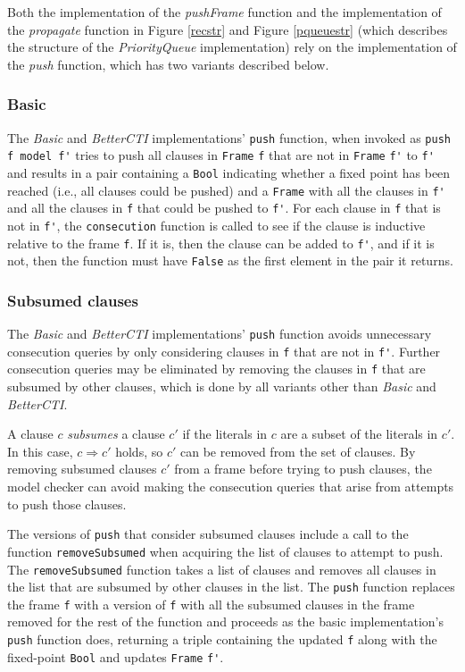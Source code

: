 \documentclass[12pt,a4paper,twoside,openright]{report}
\begin{document}
{Both the implementation of the {\it pushFrame} function and the implementation of the
{\it propagate} function in Figure \ref{recstr} and Figure \ref{pqueuestr} (which
describes the structure of the \emph{PriorityQueue} implementation)
rely on the implementation of the
{\it push} function, which has two variants described below.

\subsubsection{Basic}
The {\it Basic} and {\it BetterCTI} implementations' \verb,push, function,
when invoked as \verb,push f model f', tries to push all clauses in \verb,Frame, \verb,f,
that are not in \verb,Frame, \verb,f', to \verb,f', and
results in a pair containing a \verb,Bool, indicating whether a fixed point has been reached
(i.e., all clauses could be pushed) and a \verb,Frame, with all the clauses in \verb,f', and all
the clauses in \verb,f, that could be pushed to \verb,f',.
For each clause in \verb,f, that is not in \verb,f',, the \verb,consecution, function is called to
see if the clause is inductive relative to the frame \verb,f,. If it is, then
the clause can be added to \verb,f',, and if it is not, then the
function must have \verb,False, as the first element in the pair it returns.

\subsubsection{Subsumed clauses}
The \emph{Basic} and \emph{BetterCTI} implementations' \verb,push, function avoids unnecessary
consecution queries by only considering clauses in \verb,f, that are not in \verb,f',.
Further consecution queries may be eliminated by removing the clauses in \verb,f,
that are subsumed by other clauses, which is done by all variants other than {\it Basic}
and \emph{BetterCTI}.

A clause $c$ \emph{subsumes} a clause $c'$ if the literals in $c$ are a subset of the literals
in $c'$. In this case, $c \Rightarrow c'$ holds, so $c'$ can be removed from the set of clauses. By
removing subsumed clauses $c'$ from a frame before trying to push clauses, the model
checker can avoid making the consecution queries that arise from attempts to push those clauses.

The versions of \verb,push, that consider subsumed clauses include a call to the function
\verb,removeSubsumed, when acquiring the list of clauses to attempt to push.
The \verb,removeSubsumed, function takes a list of clauses and removes all clauses in the list
that are subsumed by other clauses in the list. The \verb,push, function replaces the frame
\verb,f, with a version of \verb,f, with all the subsumed clauses in the frame removed for
the rest of the function and proceeds as the basic implementation's \verb,push, function does,
returning a triple containing the updated \verb,f, along with the fixed-point \verb,Bool,
and updates \verb,Frame, \verb,f',.

}
\end{document}
